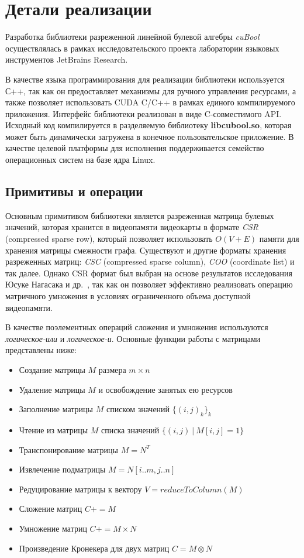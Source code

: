 \section{Детали реализации}

Разработка библиотеки разреженной линейной булевой алгебры \textit{cuBool} 
осуществлялась в рамках исследовательского проекта лаборатории языковых инструментов JetBrains Research. 

В качестве языка программирования для реализации библиотеки используется С++, 
так как он предоставляет механизмы для ручного управления ресурсами, 
а также позволяет использовать CUDA C/C++ в рамках единого компилируемого приложения. 
Интерфейс библиотеки реализован в виде C-совместимого API.
Исходный код компилируется в разделяемую библиотеку \textbf{libcubool.so}, 
которая может быть динамически загружена в конечное пользовательское приложение. 
В качестве целевой платформы для исполнения поддерживается семейство операционных систем на базе ядра Linux.

\subsection{Примитивы и операции}

Основным примитивом библиотеки является разреженная матрица булевых значений, 
которая хранится в видеопамяти видеокарты в формате \textit{CSR} (compressed sparse row), 
который позволяет использовать $O(V + E)$ памяти для хранения матрицы смежности графа. 
Существуют и другие форматы хранения разреженных матриц: \textit{CSC} (compressed sparse column), \textit{COO} (coordinate list) и так далее. 
Однако CSR формат был выбран на основе результатов исследования Юсуке Нагасака и др.~\cite{inproceedings:spgemm_mem_saving_for_nvidia}, 
так как он позволяет эффективно реализовать операцию матричного умножения в условиях ограниченного объема доступной видеопамяти. 

В качестве поэлементных операций сложения и умножения используются \textit{логическое-или} и \textit{логическое-и}. 
Основные функции работы с матрицами представлены ниже:

\begin{itemize}[noitemsep,topsep=0pt,parsep=0pt,partopsep=0pt]
    \item Создание матрицы $M$ размера $m \times n$
    \item Удаление матрицы $M$ и освобождение занятых ею ресурсов
    \item Заполнение матрицы $M$ списком значений $\{(i, j)_k\}_k$
    \item Чтение из матрицы $M$ списка значений $\{(i, j)~|~M[i,j]=1\}$
    \item Транспонирование матрицы $M = N^T$
    \item Извлечение подматрицы $M = N[i..m, j..n]$
    \item Редуцирование матрицы к вектору $V = \textit{reduceToColumn}(M)$
    \item Сложение матриц $C += M$
    \item Умножение матриц $C += M \times N$
    \item Произведение Кронекера для двух матриц $C = M \otimes N$
\end{itemize}

